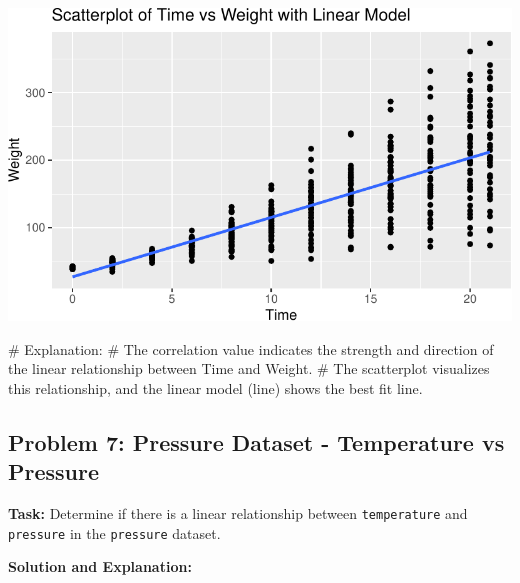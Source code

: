 \documentclass[
  letterpaper,
  DIV=11,
  numbers=noendperiod]{scrreprt}
\newenvironment{Shaded}{\begin{snugshade}}{\end{snugshade}}
\newcommand{\CommentTok}[1]{\textcolor[rgb]{0.37,0.37,0.37}{#1}}
\newcommand{\FunctionTok}[1]{\textcolor[rgb]{0.28,0.35,0.67}{#1}}
\newcommand{\NormalTok}[1]{\textcolor[rgb]{0.00,0.23,0.31}{#1}}
\newcommand{\OtherTok}[1]{\textcolor[rgb]{0.00,0.23,0.31}{#1}}
\newcommand{\SpecialCharTok}[1]{\textcolor[rgb]{0.37,0.37,0.37}{#1}}
\begin{document}
\includegraphics{Linear_Modeling_and_Regression_files/figure-pdf/unnamed-chunk-21-1.pdf}

\begin{Shaded}
\begin{Highlighting}[]
\CommentTok{\# Explanation:}
\CommentTok{\# The correlation value indicates the strength and direction of the linear relationship between Time and Weight.}
\CommentTok{\# The scatterplot visualizes this relationship, and the linear model (line) shows the best fit line.}
\end{Highlighting}
\end{Shaded}

\subsection*{Problem 7: Pressure Dataset - Temperature vs
Pressure}\label{problem-7-pressure-dataset---temperature-vs-pressure-1}

\textbf{Task:} Determine if there is a linear relationship between
\texttt{temperature} and \texttt{pressure} in the \texttt{pressure}
dataset.

\textbf{Solution and Explanation:}

\begin{Shaded}
\end{Shaded}
\end{document}
